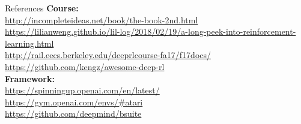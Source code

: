 \documentclass{beamer}
\begin{document}
\begin{frame}{References}
\textbf{Course:}\\
\url{http://incompleteideas.net/book/the-book-2nd.html}\\
\url{https://lilianweng.github.io/lil-log/2018/02/19/a-long-peek-into-reinforcement-learning.html}\\
\url{http://rail.eecs.berkeley.edu/deeprlcourse-fa17/f17docs/}\\
\url{https://github.com/kengz/awesome-deep-rl}\\
\textbf{Framework:}\\
\url{https://spinningup.openai.com/en/latest/}\\
\url{https://gym.openai.com/envs/#atari}\\
\url{https://github.com/deepmind/bsuite}
\end{frame}
\end{document}
